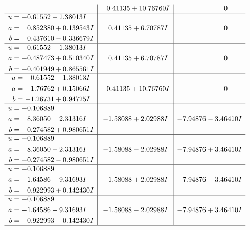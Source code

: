 \documentclass[1p]{elsarticle_modified}
\theoremstyle{definition}
\begin{document}
$$\begin{array}{c|c|c}
 & \phantom{-}0.41135 + 10.76760 I & \phantom{-0.000000 } 0 \\ \hline\begin{aligned}
u &= -0.61552 - 1.38013 I \\
a &= \phantom{-}0.852380 + 0.139543 I \\
b &= \phantom{-}0.437610 - 0.336679 I\end{aligned}
 & \phantom{-}0.41135 + 6.70787 I & \phantom{-0.000000 } 0 \\ \hline\begin{aligned}
u &= -0.61552 - 1.38013 I \\
a &= -0.487473 + 0.510340 I \\
b &= -0.401949 + 0.865561 I\end{aligned}
 & \phantom{-}0.41135 + 6.70787 I & \phantom{-0.000000 } 0 \\ \hline\begin{aligned}
u &= -0.61552 - 1.38013 I \\
a &= -1.76762 + 0.15066 I \\
b &= -1.26731 + 0.94725 I\end{aligned}
 & \phantom{-}0.41135 + 10.76760 I & \phantom{-0.000000 } 0 \\ \hline\begin{aligned}
u &= -0.106889\phantom{ +0.000000I} \\
a &= \phantom{-}8.36050 + 2.31316 I \\
b &= -0.274582 + 0.980651 I\end{aligned}
 & -1.58088 + 2.02988 I & -7.94876 - 3.46410 I \\ \hline\begin{aligned}
u &= -0.106889\phantom{ +0.000000I} \\
a &= \phantom{-}8.36050 - 2.31316 I \\
b &= -0.274582 - 0.980651 I\end{aligned}
 & -1.58088 - 2.02988 I & -7.94876 + 3.46410 I \\ \hline\begin{aligned}
u &= -0.106889\phantom{ +0.000000I} \\
a &= -1.64586 + 9.31693 I \\
b &= \phantom{-}0.922993 + 0.142430 I\end{aligned}
 & -1.58088 + 2.02988 I & -7.94876 - 3.46410 I \\ \hline\begin{aligned}
u &= -0.106889\phantom{ +0.000000I} \\
a &= -1.64586 - 9.31693 I \\
b &= \phantom{-}0.922993 - 0.142430 I\end{aligned}
 & -1.58088 - 2.02988 I & -7.94876 + 3.46410 I\\
 \hline 
 \end{array}$$\newpage\newpage\renewcommand{\arraystretch}{1}
\end{document}
